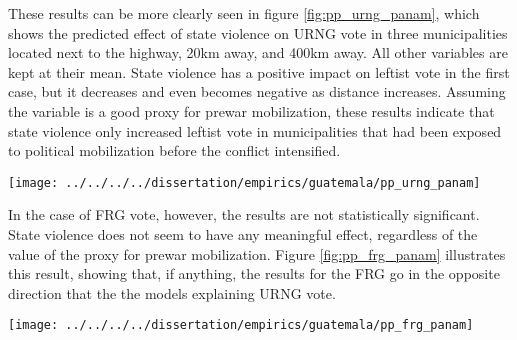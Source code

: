 \documentclass[12pt, notitlepage]{article}
\begin{document}

These results can be more clearly seen in figure \ref{fig:pp_urng_panam}, which shows the predicted effect of state violence on URNG vote in three municipalities located next to the highway, 20km away, and 400km away.
All other variables are kept at their mean.
State violence has a positive impact on leftist vote in the first case, but it decreases and even becomes negative as distance increases.
Assuming the variable is a good proxy for prewar mobilization, these results indicate that state violence only increased leftist vote in municipalities that had been exposed to political mobilization before the conflict intensified.

\begin{figure*}[htb!]
  \centering
    \texttt{[image: ../../../../dissertation/empirics/guatemala/pp\_urng\_panam]}

  \caption{Wartime state violence and URNG share depending on prewar political mobilization (proxied by distance to Pan-American Highway)} \label{fig:pp_urng_panam}


\end{figure*}

In the case of FRG vote, however, the results are not statistically significant.
State violence does not seem to have any meaningful effect, regardless of the value of the proxy for prewar mobilization.
Figure \ref{fig:pp_frg_panam} illustrates this result, showing that, if anything, the results for the FRG go in the opposite direction that the the models explaining URNG vote.

\begin{figure*}[htb!]
  \centering
    \texttt{[image: ../../../../dissertation/empirics/guatemala/pp\_frg\_panam]}

  \caption{Wartime state violence and FRG share depending on prewar political mobilization (proxied by distance to Pan-American Highway)} \label{fig:pp_frg_panam}


\end{figure*}
\end{document}
